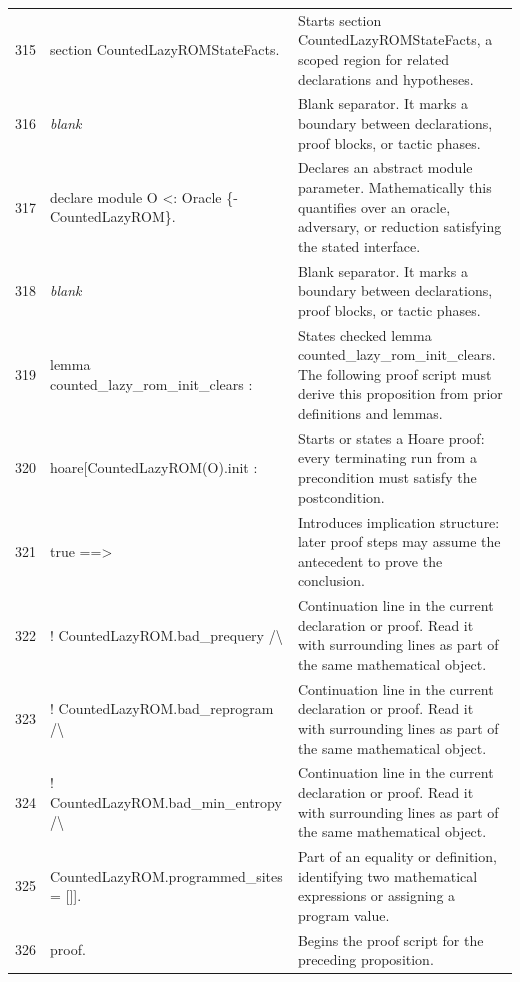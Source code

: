 \documentclass[10pt]{article}
\begin{document}
\begin{longtable}{r L{0.53\textwidth} L{0.37\textwidth}}
315 & {\ttfamily\scriptsize section CountedLazyROMStateFacts.} & Starts section CountedLazyROMStateFacts, a scoped region for related declarations and hypotheses. \\
316 & {\ttfamily\scriptsize \emph{blank}} & Blank separator.  It marks a boundary between declarations, proof blocks, or tactic phases. \\
317 & {\ttfamily\scriptsize declare module O <: Oracle \{-CountedLazyROM\}.} & Declares an abstract module parameter.  Mathematically this quantifies over an oracle, adversary, or reduction satisfying the stated interface. \\
318 & {\ttfamily\scriptsize \emph{blank}} & Blank separator.  It marks a boundary between declarations, proof blocks, or tactic phases. \\
319 & {\ttfamily\scriptsize lemma counted\_lazy\_rom\_init\_clears :} & States checked lemma counted\_lazy\_rom\_init\_clears.  The following proof script must derive this proposition from prior definitions and lemmas. \\
320 & {\ttfamily\scriptsize   hoare[CountedLazyROM(O).init :} & Starts or states a Hoare proof: every terminating run from a precondition must satisfy the postcondition. \\
321 & {\ttfamily\scriptsize     true ==>} & Introduces implication structure: later proof steps may assume the antecedent to prove the conclusion. \\
322 & {\ttfamily\scriptsize     ! CountedLazyROM.bad\_prequery /\textbackslash{}} & Continuation line in the current declaration or proof.  Read it with surrounding lines as part of the same mathematical object. \\
323 & {\ttfamily\scriptsize     ! CountedLazyROM.bad\_reprogram /\textbackslash{}} & Continuation line in the current declaration or proof.  Read it with surrounding lines as part of the same mathematical object. \\
324 & {\ttfamily\scriptsize     ! CountedLazyROM.bad\_min\_entropy /\textbackslash{}} & Continuation line in the current declaration or proof.  Read it with surrounding lines as part of the same mathematical object. \\
325 & {\ttfamily\scriptsize     CountedLazyROM.programmed\_sites = []].} & Part of an equality or definition, identifying two mathematical expressions or assigning a program value. \\
326 & {\ttfamily\scriptsize proof.} & Begins the proof script for the preceding proposition. \\

\end{longtable}
\end{document}
